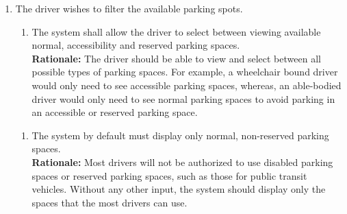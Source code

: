 \documentclass[12pt,letterpaper]{article}
\newcounter{businesseventnum}
\newcounter{funcreqnum}
\begin{document}
\begin{enumerate}[{BE}\thebusinesseventnum.] 
\item The driver wishes to filter the available parking spots.
\begin{enumerate}[{FR}\thefuncreqnum.] 
    \item The system shall allow the driver to select between viewing available
    normal, accessibility and reserved parking spaces.\\
    \textbf{Rationale:} The driver should be able to view and select between all
    possible types of parking spaces. For example, a wheelchair bound driver
    would only need to see accessible parking spaces, whereas, an able-bodied
    driver would only need to see normal parking spaces to avoid parking in an
    accessible or reserved parking space.
\end{enumerate}
\begin{enumerate}[{FR}\thefuncreqnum.] 
    \item The system by default must display only normal, non-reserved parking
    spaces.\\
    \textbf{Rationale:} Most drivers will not be authorized to use disabled
    parking spaces or reserved parking spaces, such as those for public transit
    vehicles. Without any other input, the system should display only the spaces
    that the most drivers can use.
\end{enumerate}
\end{enumerate}
\end{document}
